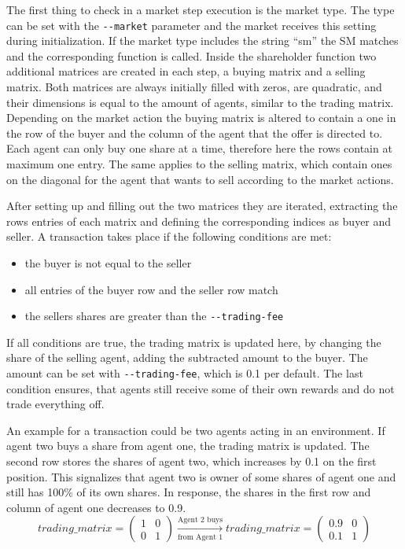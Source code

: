 The first thing to check in a market step execution is the market type. The type can be set with the \verb|--market| parameter and the market receives this setting during initialization. If the market type includes the string ``sm'' the SM matches and the corresponding function is called. 
Inside the shareholder function two additional matrices are created in each step, a buying matrix and a selling matrix. Both matrices are always initially filled with zeros, are quadratic, and their dimensions is equal to the amount of agents, similar to the trading matrix. Depending on the market action the buying matrix is altered to contain a one in the row of the buyer and the column of the agent that the offer is directed to.
Each agent can only buy one share at a time, therefore here the rows contain at maximum one entry. The same applies to the selling matrix, which contain ones on the diagonal for the agent that wants to sell according to the market actions.

After setting up and filling out the two matrices they are iterated, extracting the rows entries of each matrix and defining the corresponding indices as buyer and seller. A transaction takes place if the following conditions are met:
\begin{itemize}
    \item the buyer is not equal to the seller
    \item all entries of the buyer row and the seller row match
    \item the sellers shares are greater than the \verb|--trading-fee|
\end{itemize}

If all conditions are true, the trading matrix is updated here, by changing the share of the selling agent, adding the subtracted amount to the buyer. The amount can be set with \verb|--trading-fee|, which is 0.1 per default. The last condition ensures, that agents still receive some of their own rewards and do not trade everything off. 

An example for a transaction could be two agents acting in an environment. If agent two buys a share from agent one, the trading matrix is updated. The second row stores the shares of agent two, which increases by 0.1 on the first position. This signalizes that agent two is owner of some shares of agent one and still has 100\% of its own shares. In response, the shares in the first row and column of agent one decreases to 0.9.
\begin{equation*}
trading\_matrix = 
\begin{pmatrix}
1 & 0 \\
0 & 1
\end{pmatrix} \xrightarrow[\text{from Agent 1}]{\text{Agent 2 buys}} 
trading\_matrix = 
\begin{pmatrix}
0.9 & 0 \\
0.1 & 1
\end{pmatrix} 
\end{equation*}

